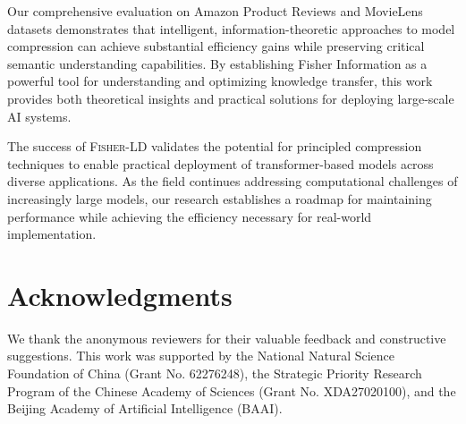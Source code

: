 \documentclass[10pt,conference]{IEEEtran}
\newcommand{\fisherld}{\textsc{Fisher-LD}}
\begin{document}
Our comprehensive evaluation on Amazon Product Reviews and MovieLens datasets demonstrates that intelligent, information-theoretic approaches to model compression can achieve substantial efficiency gains while preserving critical semantic understanding capabilities. By establishing Fisher Information as a powerful tool for understanding and optimizing knowledge transfer, this work provides both theoretical insights and practical solutions for deploying large-scale AI systems.

The success of \fisherld{} validates the potential for principled compression techniques to enable practical deployment of transformer-based models across diverse applications. As the field continues addressing computational challenges of increasingly large models, our research establishes a roadmap for maintaining performance while achieving the efficiency necessary for real-world implementation.

\section*{Acknowledgments}

We thank the anonymous reviewers for their valuable feedback and constructive suggestions. This work was supported by the National Natural Science Foundation of China (Grant No. 62276248), the Strategic Priority Research Program of the Chinese Academy of Sciences (Grant No. XDA27020100), and the Beijing Academy of Artificial Intelligence (BAAI).

\balance


\end{document}
